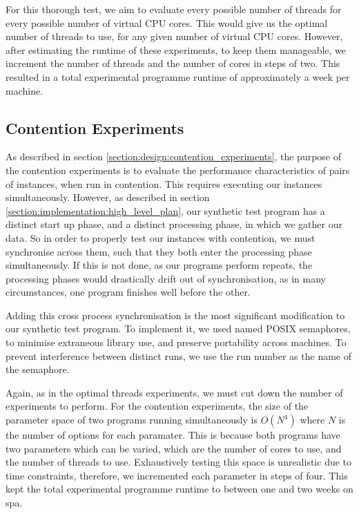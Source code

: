 For this thorough test, we aim to evaluate every possible number of threads for every possible number of virtual CPU cores. This would give us the optimal number of threads to use, for any given number of virtual CPU cores. However, after estimating the runtime of these experiments, to keep them manageable, we increment the number of threads and the number of cores in steps of two. This resulted in a total experimental programme runtime of approximately a week per machine.



\subsection{Contention Experiments}
\label{section:experimental_methodology:contention_experiments}

As described in section \ref{section:design:contention_experiments}, the purpose of the contention experiments is to evaluate the performance characteristics of pairs of instances, when run in contention. This requires executing our instances simultaneously. However, as described in section \ref{section:implementation:high_level_plan}, our synthetic test program has a distinct start up phase, and a distinct processing phase, in which we gather our data. So in order to properly test our instances with contention, we must synchronise across them, such that they both enter the processing phase simultaneously. If this is not done, as our programs perform repeats, the processing phases would drastically drift out of synchronisation, as in many circumstances, one program finishes well before the other.

Adding this cross process synchronisation is the most significant modification to our synthetic test program. To implement it, we used named POSIX semaphores, to minimise extraneous library use, and preserve portability across machines. To prevent interference between distinct runs, we use the run number as the name of the semaphore.

Again, as in the optimal threads experiments, we must cut down the number of experiments to perform. For the contention experiments, the size of the parameter space of two programs running simultaneously is $O(N^4)$ where $N$ is the number of options for each paramater. This is because both programs have two parameters which can be varied, which are the number of cores to use, and the number of threads to use. Exhaustively testing this space is unrealistic due to time constraints, therefore, we incremented each parameter in steps of four. This kept the total experimental programme runtime to between one and two weeks on spa.


